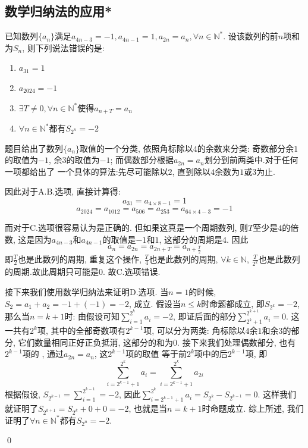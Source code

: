 \subsection{数学归纳法的应用*}
\begin{example}
    已知数列\(\{a_n\}\)满足\(a_{4n-3}=-1, a_{4n-1}=1, a_{2n}=a_n,\forall n\in \mathbb{N}^*\).
    设该数列的前\(n\)项和为\(S_n\), 则下列说法错误的是:
    \begin{enumerate}
        \setlength{\itemsep}{-\itemsep}
        \item[\rm{A.}] \(a_{31}=1\)
        \item[\rm{B.}] \(a_{2024}=-1\)
        \item[\rm{C.}] \(\exists T\neq 0,\forall n\in \mathbb{N}^*\)使得\(a_{n+T}=a_n\)
        \item[\rm{D.}] \(\forall n\in \mathbb{N}^*\)都有\(S_{2^n}=-2\)
    \end{enumerate}
\end{example}
\begin{jie}
    题目给出了数列\(\{a_n\}\)取值的一个分类, 依照角标除以\(4\)的余数来分类:
    奇数部分余\(1\)的取值为\(-1\), 余\(3\)的取值为\(-1\);
    而偶数部分根据\(a_{2n}=a_n\)划分到前两类中.对于任何一项都给出了
    一个具体的算法:先尽可能除以\(2\), 直到除以\(4\)余数为\(1\)或\(3\)为止.

    因此对于\(\mathrm{A.B.}\)选项, 直接计算得:
    \[a_{31}=a_{4\times 8-1}=1\]
    \[a_{2024}=a_{1012}=a_{506}=a_{253}=a_{64\times 4-3}=-1\]

    而对于\(\mathrm{C}.\)选项很容易认为是正确的. 但如果这真是一个周期数列,
    则\(T\)至少是\(4\)的倍数, 这是因为\(a_{4n-3}\)和\(a_{4n-1}\)的取值是\(-1\)和\(1\), 这部分的周期是\(4\).
    因此\[a_n=a_{2n}=a_{2n+T}=a_{n+\frac{T}{2}}\]
    即\(\frac{T}{2}\)也是此数列的周期, 重复这个操作, \(\frac{T}{4}\)也是此数列的周期,
    \(\forall k\in \mathbb{N}\), \(\frac{T}{2^k}\)也是此数列的周期.故此周期只可能是\(0\).
    故\(\mathrm{C}.\)选项错误.

    接下来我们使用数学归纳法来证明\(\mathrm{D}.\)选项.
    当\(n=1\)的时候, \(S_2=a_1+a_2=-1+(-1)=-2\), 成立.
    假设当\(n\leq k\)时命题都成立, 即\(S_{2^k}=-2\), 那么当\(n=k+1\)时:
    由假设可知\(\sum_{i=1}^{2^k}a_i=-2 \), 即证后面的部分\(\sum_{2^k+1}^{2^{k+1}}a_i=0\).
    这一共有\(2^k\)项, 其中的全部奇数项有\(2^{k-1}\)项, 可以分为两类:
    角标除以\(4\)余\(1\)和余\(3\)的部分, 它们数量相同正好正负抵消,  这部分的和为\(0\).
    接下来我们处理偶数部分, 也有\(2^{k-1}\)项的 , 通过\(a_{2n}=a_n\), 这\(2^{k-1}\)项的取值
    等于前\(2^k\)项中的后\(2^{k-1}\)项, 即
    \[\sum_{i=2^{k-1}+1}^{2^k}a_i=\sum_{i=2^{k-1}+1}^{2^k}a_{2i}\]
    根据假设, \(S_{2^{k-1}}=\sum_{i=1}^{2^{k-1}}=-2\), 因此\(\sum_{i=2^{k-1}+1}^{2^k}a_i=S_{2^k}-S_{2^{k-1}}=0\).
    这样我们就证明了\(S_{2^{k+1}}=S_{2^k}+0+0=-2\), 也就是当\(n=k+1\)时命题成立.
    综上所述, 我们证明了\(\forall n\in \mathbb{N}^*\)都有\(S_{2^n}=-2\).
  
    \qed
\end{jie}
\clearpage